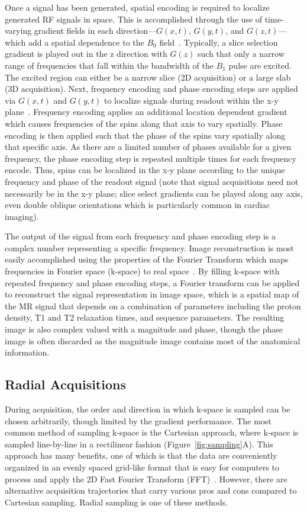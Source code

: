 Once a signal has been generated, spatial encoding is required to localize generated RF signals in space. This is accomplished through the use of time-varying gradient fields in each direction---$G(x,t)$, $G(y,t)$, and $G(z,t)$---which add a spatial dependence to the $B_0$ field~\cite{mamourianPracticalMRPhysics2010}. Typically, a slice selection gradient is played out in the z direction with $G(z)$ such that only a narrow range of frequencies that fall within the bandwidth of the $B_1$ pulse are excited. The excited region can either be a narrow slice (2D acquisition) or a large slab (3D acquisition). Next, frequency encoding and phase encoding steps are applied via $G(x,t)$ and $G(y,t)$ to localize signals during readout within the x-y plane~\cite{mamourianPracticalMRPhysics2010}. Frequency encoding applies an additional location dependent gradient which causes frequencies of the spins along that axis to vary spatially. Phase encoding is then applied such that the phase of the spins vary spatially along that specific axis. As there are a limited number of phases available for a given frequency, the phase encoding step is repeated multiple times for each frequency encode. Thus, spins can be localized in the x-y plane according to the unique frequency and phase of the readout signal (note that signal acquisitions need not necessarily be in the x-y plane; slice select gradients can be played along any axis, even double oblique orientations which is particularly common in cardiac imaging).

The output of the signal from each frequency and phase encoding step is a complex number representing a specific frequency. Image reconstruction is most easily accomplished using the properties of the Fourier Transform which maps frequencies in Fourier space (k-space) to real space~\cite{mooreReviewKeyConcepts2017}. By filling k-space with repeated frequency and phase encoding steps, a Fourier transform can be applied to reconstruct the signal representation in image space, which is a spatial map of the MR signal that depends on a combination of parameters including the proton density, T1 and T2 relaxation times, and sequence parameters. The resulting image is also complex valued with a magnitude and phase, though the phase image is often discarded as the magnitude image contains most of the anatomical information.

\subsection{Radial Acquisitions}\label{sec:radial}
During acquisition, the order and direction in which k-space is sampled can be chosen arbitrarily, though limited by the gradient performance. The most common method of sampling k-space is the Cartesian approach, where k-space is sampled line-by-line in a rectilinear fashion (Figure~\ref{fig:sampling}A). This approach has many benefits, one of which is that the data are conveniently organized in an evenly spaced grid-like format that is easy for computers to process and apply the 2D Fast Fourier Transform (FFT)~\cite{mamourianPracticalMRPhysics2010}. However, there are alternative acquisition trajectories that carry various pros and cons compared to Cartesian sampling. Radial sampling is one of these methods.

